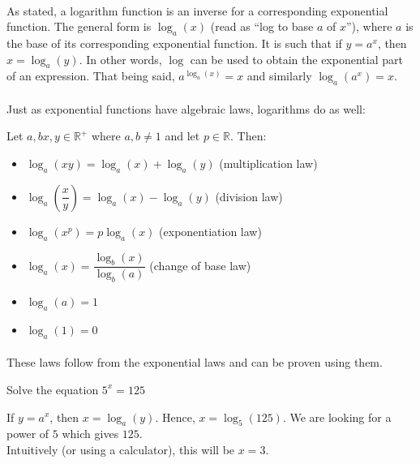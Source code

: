 \documentclass[12pt, a4paper, titlepage, twoside]{article}
\newcommand*{\R}{\mathbb{R}}
\newcounter{excount}[subsection]
\begin{document}
	\paragraph{}
	As stated, a logarithm function is an inverse for a corresponding exponential function. The general form is $\log_a(x)$ (read as
	``log to base $a$ of $x$''), where $a$ is the base of its corresponding exponential function. It is such that if $y = a^x$, then 
	$x = \log_a(y)$. In other words, $\log$ can be used to obtain the exponential part of an expression. That being said, 
	$a^{\log_a(x)} = x$ and similarly $\log_a(a^x) = x$.
	
	\paragraph{}
	Just as exponential functions have algebraic laws, logarithms do as well:\\
	
	\begin{kp}
		Let $a, b x, y \in \R^+$ where $a, b \neq 1$ and let $p \in \R$. Then:
		
		\begin{itemize}
			\item $\log_a(xy) = \log_a(x) + \log_a(y)$ (multiplication law)
			\item $ \log_a\left(\dfrac{x}{y}\right) = \log_a(x) - \log_a(y)$ (division law)
			\item $\log_a(x^p) = p \log_a(x)$ (exponentiation law)
			\item $\log_a(x) = \dfrac{\log_b(x)}{\log_b(a)}$ (change of base law)
			\item $\log_a(a) = 1$
			\item $\log_a(1) = 0$
		\end{itemize}
	\end{kp}
	
	\paragraph{}
	These laws follow from the exponential laws and can be proven using them.\\
	
	\begin{ex}
		Solve the equation $5^x = 125$
		
		\hfill
		\tcbline
		\hfill
		
		If $y = a^x$, then $x = \log_a(y)$. Hence, $x = \log_5(125)$. We are looking for a power of $5$ which gives $125$.\\
		
		Intuitively (or using a calculator), this will be $x = 3$. 
	\end{ex}
	
\end{document}
